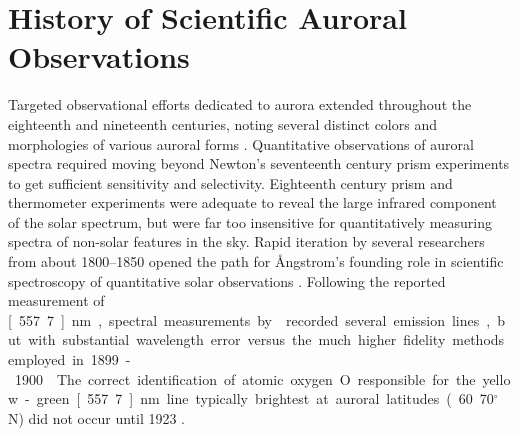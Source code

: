 \section{History of Scientific Auroral Observations}\label{sec:historyaurora}

Targeted observational efforts dedicated to aurora extended throughout the eighteenth and nineteenth centuries, noting several distinct colors and morphologies of various auroral forms \citep{wilcke1778,schwickert1833}.
Quantitative observations of auroral spectra required moving beyond Newton's seventeenth century prism experiments to get sufficient sensitivity and selectivity.
Eighteenth century prism and thermometer experiments \citep{herschel1800} were adequate to reveal the large infrared component of the solar spectrum, but were far too insensitive for quantitatively measuring spectra of non-solar features in the sky.
Rapid iteration by several researchers from about 1800--1850 opened the path for \AA ngstrom's founding role in scientific spectroscopy of quantitative solar observations \citep{reifacherman2014}.
Following the \citet{angstrom1869} reported measurement of \unit[557.7]{nm}, spectral measurements by \citet{fritz1881} recorded several emission lines, but with substantial wavelength error versus the much higher fidelity methods employed in 1899-1900 \citep{sykora1901,chernouss2005}.
The correct identification of atomic oxygen O responsible for the yellow-green \unit[557.7]{nm} line typically brightest at auroral latitudes (60..70$^\circ$ N) did not occur until 1923 \citep{chernouss2008}.

